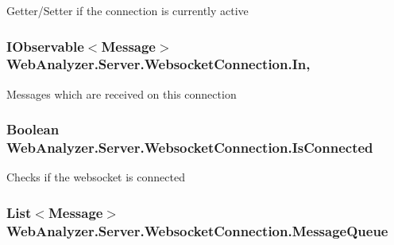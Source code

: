Getter/\+Setter if the connection is currently active 

\hypertarget{class_web_analyzer_1_1_server_1_1_websocket_connection_aaff532a55d94eaddd75a2619da307c6a}{}
\subsubsection[{In}]{\setlength{\rightskip}{0pt plus 5cm}I\+Observable$<${\bf Message}$>$ Web\+Analyzer.\+Server.\+Websocket\+Connection.\+In\hspace{0.3cm}{\ttfamily [get]}, {\ttfamily [set]}}\label{class_web_analyzer_1_1_server_1_1_websocket_connection_aaff532a55d94eaddd75a2619da307c6a}


Messages which are received on this connection 

\hypertarget{class_web_analyzer_1_1_server_1_1_websocket_connection_a54d71b7e50589c027fff5441dea6ca54}{}
\subsubsection[{Is\+Connected}]{\setlength{\rightskip}{0pt plus 5cm}Boolean Web\+Analyzer.\+Server.\+Websocket\+Connection.\+Is\+Connected\hspace{0.3cm}{\ttfamily [get]}}\label{class_web_analyzer_1_1_server_1_1_websocket_connection_a54d71b7e50589c027fff5441dea6ca54}


Checks if the websocket is connected 

\hypertarget{class_web_analyzer_1_1_server_1_1_websocket_connection_a0351f67ba0d69e6d5701ef34395e0a59}{}
\subsubsection[{Message\+Queue}]{\setlength{\rightskip}{0pt plus 5cm}List$<${\bf Message}$>$ Web\+Analyzer.\+Server.\+Websocket\+Connection.\+Message\+Queue\hspace{0.3cm}{\ttfamily [get]}}\label{class_web_analyzer_1_1_server_1_1_websocket_connection_a0351f67ba0d69e6d5701ef34395e0a59}


